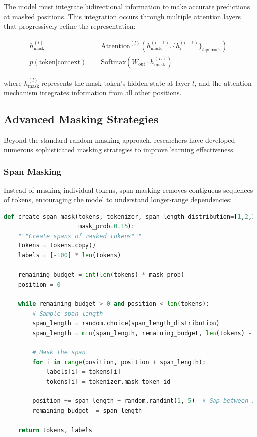 The model must integrate bidirectional information to make accurate predictions at masked positions. This integration occurs through multiple attention layers that progressively refine the representation:

\begin{align}
h_{\text{mask}}^{(l)} &= \text{Attention}^{(l)}(h_{\text{mask}}^{(l-1)}, \{h_i^{(l-1)}\}_{i \neq \text{mask}}) \\
p(\text{token} | \text{context}) &= \text{Softmax}(W_{\text{out}} \cdot h_{\text{mask}}^{(L)})
\end{align}

where $h_{\text{mask}}^{(l)}$ represents the mask token's hidden state at layer $l$, and the attention mechanism integrates information from all other positions.

\subsection{Advanced Masking Strategies}

Beyond the standard random masking approach, researchers have developed numerous sophisticated masking strategies to improve learning effectiveness.

\subsubsection{Span Masking}

Instead of masking individual tokens, span masking removes contiguous sequences of tokens, encouraging the model to understand longer-range dependencies:

\begin{lstlisting}[language=Python, caption=Span masking implementation]
def create_span_mask(tokens, tokenizer, span_length_distribution=[1,2,3,4,5], 
                     mask_prob=0.15):
    """Create spans of masked tokens"""
    tokens = tokens.copy()
    labels = [-100] * len(tokens)
    
    remaining_budget = int(len(tokens) * mask_prob)
    position = 0
    
    while remaining_budget > 0 and position < len(tokens):
        # Sample span length
        span_length = random.choice(span_length_distribution)
        span_length = min(span_length, remaining_budget, len(tokens) - position)
        
        # Mask the span
        for i in range(position, position + span_length):
            labels[i] = tokens[i]
            tokens[i] = tokenizer.mask_token_id
        
        position += span_length + random.randint(1, 5)  # Gap between spans
        remaining_budget -= span_length
    
    return tokens, labels
\end{lstlisting}

